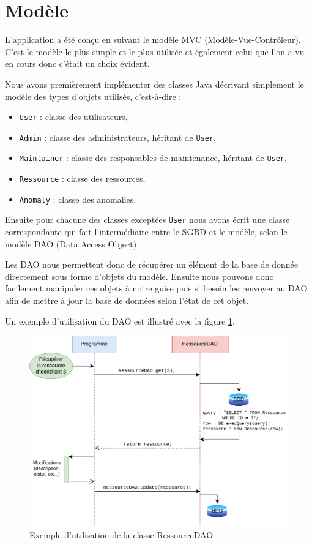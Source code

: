 \section{Modèle}

L'application a été conçu en suivant le modèle MVC (Modèle-Vue-Contrôleur). C'est le modèle le
plus simple et le plus utilisée et également celui que l'on a vu en cours donc c'était un choix
évident.\newline

Nous avons premièrement implémenter des classes Java décrivant simplement le
modèle des types d'objets utilisés, c'est-à-dire :
\begin{itemize}
    \item \verb:User: : classe des utilisateurs,
    \item \verb:Admin: : classe des administrateurs, héritant de \verb:User:,
    \item \verb:Maintainer: : classe des responsables de maintenance, héritant de \verb:User:,
    \item \verb:Ressource: : classe des ressources,
    \item \verb:Anomaly: : classe des anomalies.
\end{itemize}
\medskip

Ensuite pour chacune des classes exceptées \verb:User: nous avons écrit une classe correspondante
qui fait l'intermédiaire entre le SGBD et le modèle, selon le modèle DAO (Data Access Object).
\newline

Les DAO nous permettent donc de récupérer un élément de la base de donnée directement sous forme
d'objets du modèle. Ensuite nous pouvons donc facilement manipuler ces objets à notre guise puis
si besoin les renvoyer au DAO afin de mettre à jour la base de données selon l'état de cet objet.

Un exemple d'utilisation du DAO est illustré avec la figure \ref{fig:dao}.

\begin{figure}[h]
    \centering
    \includegraphics[width=\textwidth]{img/DAO.png}
    \caption{Exemple d'utilisation de la classe RessourceDAO}
    \label{fig:dao}
\end{figure}
\newpage
\medskip


